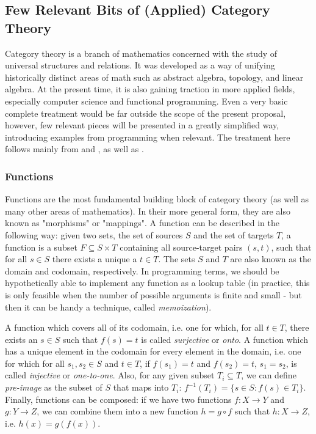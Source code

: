 \documentclass[12pt,a4paper]{article}
\begin{document}
\subsection{Few Relevant Bits of (Applied) Category Theory}
\label{ref:categorytheory}

Category theory is a branch of mathematics concerned with the study of universal structures and relations. It was developed as a way of unifying historically distinct areas of math such as abstract algebra, topology, and linear algebra. At the present time, it is also gaining traction in more applied fields, especially computer science and functional programming. Even a very basic complete treatment would be far outside the scope of the present proposal, however, few relevant pieces will be presented in a greatly simplified way, introducing examples from programming when relevant. The treatment here follows mainly from \cite{fong2019} and \cite{Milewski2018}, as well as \cite{leinster2014}.

\subsubsection{Functions}
\label{sec:functions}

Functions are the most fundamental building block of category theory (as well as many other areas of mathematics). In their more general form, they are also known as "morphisms" or "mappings". A function can be described in the following way: given two sets, the set of sources $S$ and the set of targets $T$, a function is a subset $F \subseteq S \times T$ containing all source-target pairs $(s, t)$, such that for all $s \in S$ there exists a unique a $t \in T$. The sets $S$ and $T$ are also known as the domain and codomain, respectively. In programming terms, we should be hypothetically able to implement any function as a lookup table (in practice, this is only feasible when the number of possible arguments is finite and small - but then it can be handy a technique, called \textit{memoization}).  

A function which covers all of its codomain, i.e. one for which, for all $t \in T$, there exists an $s \in S$ such that $f(s) = t$ is called \textit{surjective} or \textit{onto}. A function which has a unique element in the codomain for every element in the domain, i.e. one for which for all $s_1, s_2 \in S$ and $t \in T$, if $f(s_1) = t$ and $f(s_2) = t$, $s_1 = s_2$, is called \textit{injective} or \textit{one-to-one}. Also, for any given subset $T_i \subseteq T$, we can define \textit{pre-image} as the subset of $S$ that maps into $T_i$: $f^{-1}(T_i) = \{ s \in S : f(s) \in T_i \}$. Finally, functions can be composed: if we have two functions $f: X \to Y$ and $g: Y \to Z$, we can combine them into a new function $h = g \circ f$ such that $h: X \to Z$, i.e. $h(x) = g(f(x))$. 
\end{document}
